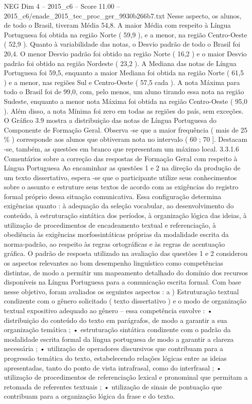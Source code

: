 \begin{textsample}{NEG Dim 4 – 2015\_c6 – Score 11.00 – 2015\_c6/enade\_2015\_tec\_proc\_ger\_9930b266b7.txt}
Nesse aspecto, os alunos, de todo o Brasil, tiveram Média 54,8.
A maior Média com respeito à Língua Portuguesa foi obtida na região Norte ( 59,9 ), e a menor, na região Centro-Oeste ( 52,9 ).
Quanto à variabilidade das notas, o Desvio padrão de todo o Brasil foi 20,4.
O menor Desvio padrão foi obtido na região Norte ( 16,2 ) e o maior Desvio padrão foi obtido na região Nordeste ( 23,2 ).
A Mediana das notas de Língua Portuguesa foi 59,5, enquanto a maior Mediana foi obtida na região Norte ( 61,5 ) e a menor, nas regiões Sul e Centro-Oeste ( 57,5 cada ).
A nota Máxima para todo o Brasil foi de 99,0, com, pelo menos, um aluno tirando essa nota na região Sudeste, enquanto a menor nota Máxima foi obtida na região Centro-Oeste ( 95,0 ).
Além disso, a nota Mínima foi zero em todas as regiões do país, sem exceções.
O Gráfico 3.9 mostra a distribuição das notas de Língua Portuguesa do Componente de Formação Geral.
Observa -se que a maior frequência ( mais de 25 \% ) corresponde aos alunos que obtiveram nota no intervalo ( 60 ; 70 ].
Destacam -se, também, as questões em branco que representam um máximo local. 3.3.1.6 Comentários sobre a correção das respostas de Formação Geral com respeito à Língua Portuguesa Ao encaminhar as questões 1 e 2 na direção da produção de um texto dissertativo, espera -se que o participante utilize seus conhecimentos sobre o assunto e estruture seus textos de acordo com as exigências do registro formal próprio dessa situação comunicativa.
Essa configuração determina exigências quanto : à adequação da seleção vocabular, ao desenvolvimento do conteúdo, à estruturação sintática dos períodos, à organização lógica das ideias, à utilização de procedimentos de encadeamento textual e referenciação, à obediência às exigências morfossintáticas próprias da modalidade escrita da norma-padrão, ao respeito às regras ortográficas e às regras de acentuação gráfica.
O padrão de resposta utilizado na avaliação das questões 1 e 2 considerou os aspectos relevantes ao bom desempenho linguístico como competências distintas, de modo a permitir um mapeamento detalhado do domínio dos recursos disponíveis na Língua Portuguesa para a comunicação escrita formal.
Com base nesse objetivo, foram avaliados os seguintes aspectos : a ) Estruturação textual condizente com o gênero solicitado ( texto dissertativo ) e o modo de organização textual expositivo adequado ao gênero – essa competência envolve : • distribuição do conteúdo do texto em parágrafos, de modo a garantir a sua organização temática ; • estruturação sintática condizente com o padrão da modalidade escrita formal da língua portuguesa de modo a garantir a clareza necessária ; • utilização de operadores discursivos que contribuam para a progressão temática do texto, estabelecendo relações lógicas entre as ideias apresentadas, tanto do ponto de vista intrafrasal, como do interfrasal ; • utilização de procedimentos de referenciação lexical e pronominal que permitam a retomada de referentes textuais ; • utilização de sinais de pontuação que contribuam para a organização lógica da frase e do texto.

\end{textsample}
